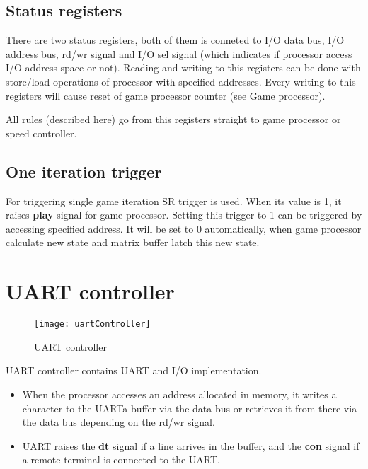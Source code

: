 \subsection*{Status registers}

There are two status registers, both of them is conneted to I/O data bus, I/O address bus, rd/wr signal and I/O sel signal (which indicates if processor access I/O address space or not). Reading and writing to this registers can be done with store/load operations of processor with specified addresses. Every writing to this registers will cause reset of game processor counter (see Game processor).

All rules (described here) go from this registers straight to game processor or speed controller.

\subsection*{One iteration trigger}

For triggering single game iteration SR trigger is used. When its value is 1, it raises \textbf{play} signal for game processor. Setting this trigger to 1 can be triggered by accessing specified address. It will be set to 0 automatically, when game processor calculate new state and matrix buffer latch this new state.

\section*{UART controller}

\begin{figure}[ht]
	\centering
	\texttt{[image: uartController]}
	\caption{UART controller}
\end{figure}

UART controller contains UART and I/O implementation.

\begin{itemize}
	\item When the processor accesses an address allocated in memory, it writes a character to the UARTa buffer via the data bus or retrieves it from there via the data bus depending on the rd/wr signal.
	\item UART raises the \textbf{dt} signal if a line arrives in the buffer, and the \textbf{con} signal if a remote terminal is connected to the UART.
\end{itemize}
